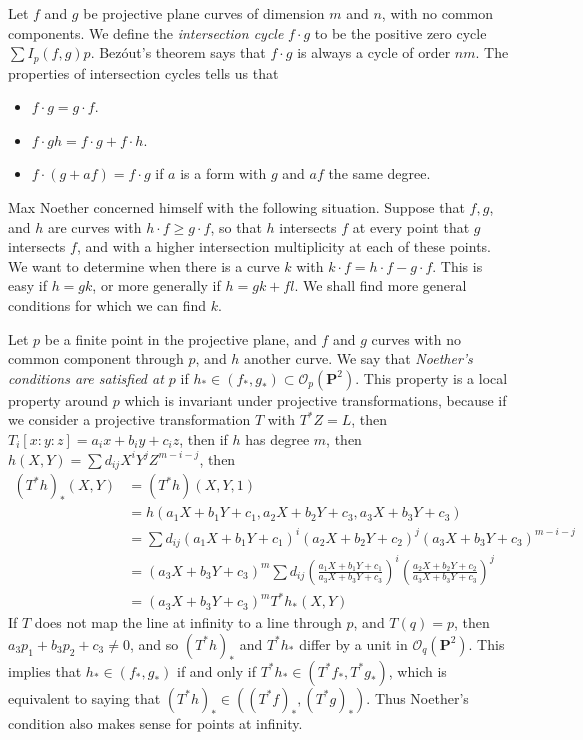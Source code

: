Let $f$ and $g$ be projective plane curves of dimension $m$ and $n$, with no common components. We define the \emph{intersection cycle} $f \cdot g$ to be the positive zero cycle $\sum I_p(f,g) p$. Bez\'{o}ut's theorem says that $f \cdot g$ is always a cycle of order $nm$. The properties of intersection cycles tells us that
%
\begin{itemize}
    \item $f \cdot g = g \cdot f$.
    \item $f \cdot gh = f \cdot g + f \cdot h$.
    \item $f \cdot (g + af) = f \cdot g$ if $a$ is a form with $g$ and $af$ the same degree.
\end{itemize}
%
Max Noether concerned himself with the following situation. Suppose that $f,g$, and $h$ are curves with $h \cdot f \geq g \cdot f$, so that $h$ intersects $f$ at every point that $g$ intersects $f$, and with a higher intersection multiplicity at each of these points. We want to determine when there is a curve $k$ with $k \cdot f = h \cdot f - g \cdot f$. This is easy if $h = gk$, or more generally if $h = gk + fl$. We shall find more general conditions for which we can find $k$.

Let $p$ be a finite point in the projective plane, and $f$ and $g$ curves with no common component through $p$, and $h$ another curve. We say that \emph{Noether's conditions are satisfied at $p$} if $h_* \in (f_*, g_*) \subset \mathcal{O}_p(\mathbf{P}^2)$. This property is a local property around $p$ which is invariant under projective transformations, because if we consider a projective transformation $T$ with $T^*Z = L$, then
%
$T_i[x:y:z] = a_ix + b_iy + c_iz$, then if $h$ has degree $m$, then $h(X,Y) = \sum d_{ij}X^iY^jZ^{m-i-j}$, then
%
\begin{align*}
    (T^*h)_*(X,Y) &= (T^*h)(X,Y,1)\\
    &= h(a_1X + b_1Y + c_1, a_2X + b_2Y + c_3, a_3X + b_3Y + c_3)\\
    &= \sum d_{ij} (a_1X + b_1Y + c_1)^i(a_2X + b_2Y + c_2)^j(a_3X + b_3Y + c_3)^{m-i-j}\\
    &= (a_3X + b_3Y + c_3)^m \sum d_{ij} \left( \frac{a_1X + b_1Y + c_1}{a_3X + b_3Y + c_3} \right)^i \left( \frac{a_2X + b_2Y + c_2}{a_3X + b_3Y + c_3} \right)^j\\
    &= (a_3X + b_3Y + c_3)^m T^*h_*(X,Y)
\end{align*}
%
If $T$ does not map the line at infinity to a line through $p$, and $T(q) = p$, then $a_3p_1 + b_3p_2 + c_3 \neq 0$, and so $(T^*h)_*$ and $T^*h_*$ differ by a unit in $\mathcal{O}_q(\mathbf{P}^2)$. This implies that $h_* \in (f_*, g_*)$ if and only if $T^*h_* \in (T^*f_*, T^*g_*)$, which is equivalent to saying that $(T^*h)_* \in ((T^*f)_*, (T^*g)_*)$. Thus Noether's condition also makes sense for points at infinity.

